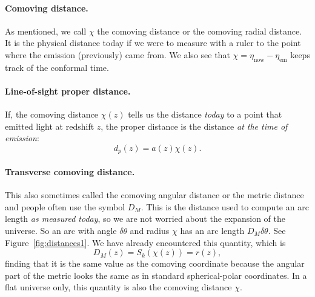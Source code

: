 \paragraph{Comoving distance.}
As mentioned, we call $\chi$ the comoving distance or the comoving radial distance.  It is the physical distance today if we were to measure with a ruler to the point where the emission (previously) came from.  We also see that $\chi = \eta_\textrm{now} - \eta_\textrm{em}$ keeps track of the conformal time.

\paragraph{Line-of-sight proper distance.}  If, the comoving distance $\chi(z)$ tells us the distance \textit{today} to a point that emitted light at redshift $z$, the proper distance is the distance \textit{at the time of emission}:
\begin{equation}
  d_p(z) = a(z) \chi(z).
\end{equation}


\paragraph{Transverse comoving distance.}  This also sometimes called the comoving angular distance or the metric distance and people often use the symbol $D_M$.  This is the distance used to compute an arc length \textit{as measured today}, so we are not worried about the expansion of the universe.  So an arc with angle $\delta\theta$ and radius $\chi$ has an arc length $D_M \delta\theta$.  See Figure~\ref{fig:distances1}.  We have already encountered this quantity, which is
\begin{equation}
  D_M(z) = S_k(\chi(z)) = r(z),
\end{equation}
finding that it is the same value as the comoving coordinate because the angular part of the metric looks the same as in standard spherical-polar coordinates.  In a flat universe only, this quantity is also the comoving distance $\chi$.

